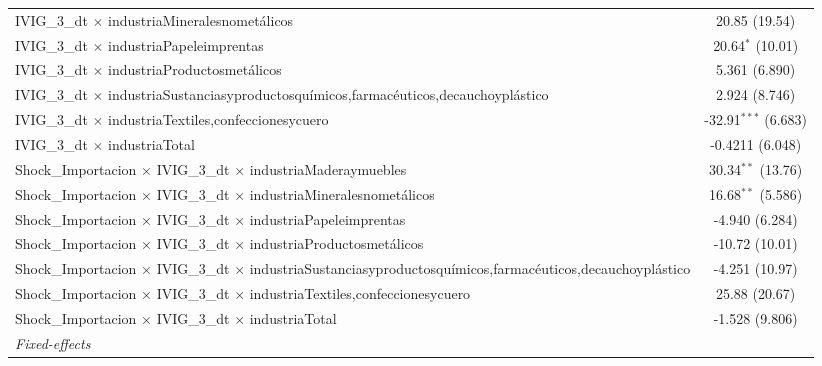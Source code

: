 \documentclass[12pt]{article}
\begin{document}
\begin{table}[htbp]
\begin{threeparttable}
\begin{tabular}{lc}
      IVIG\_3\_dt $\times$ industriaMineralesnometálicos                                                                          & 20.85 (19.54)\\   
      IVIG\_3\_dt $\times$ industriaPapeleimprentas                                                                               & 20.64$^{*}$ (10.01)\\   
      IVIG\_3\_dt $\times$ industriaProductosmetálicos                                                                            & 5.361 (6.890)\\   
      IVIG\_3\_dt $\times$ industriaSustanciasyproductosquímicos,farmacéuticos,decauchoyplástico                                  & 2.924 (8.746)\\   
      IVIG\_3\_dt $\times$ industriaTextiles,confeccionesycuero                                                                   & -32.91$^{***}$ (6.683)\\   
      IVIG\_3\_dt $\times$ industriaTotal                                                                                         & -0.4211 (6.048)\\   
      Shock\_Importacion $\times$ IVIG\_3\_dt $\times$ industriaMaderaymuebles                                                    & 30.34$^{**}$ (13.76)\\   
      Shock\_Importacion $\times$ IVIG\_3\_dt $\times$ industriaMineralesnometálicos                                              & 16.68$^{**}$ (5.586)\\   
      Shock\_Importacion $\times$ IVIG\_3\_dt $\times$ industriaPapeleimprentas                                                   & -4.940 (6.284)\\   
      Shock\_Importacion $\times$ IVIG\_3\_dt $\times$ industriaProductosmetálicos                                                & -10.72 (10.01)\\   
      Shock\_Importacion $\times$ IVIG\_3\_dt $\times$ industriaSustanciasyproductosquímicos,farmacéuticos,decauchoyplástico      & -4.251 (10.97)\\   
      Shock\_Importacion $\times$ IVIG\_3\_dt $\times$ industriaTextiles,confeccionesycuero                                       & 25.88 (20.67)\\   
      Shock\_Importacion $\times$ IVIG\_3\_dt $\times$ industriaTotal                                                             & -1.528 (9.806)\\   
      \midrule
      \emph{Fixed-effects}\\

\end{tabular}
\end{threeparttable}
\end{table}
\end{document}
